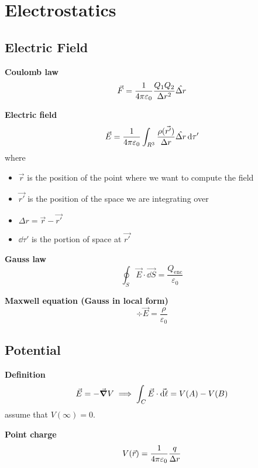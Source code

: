 \documentclass[10pt]{extarticle}
\numberwithin{equation}{section}
\begin{document}
\section{Electrostatics}
\begin{multicols}{2}
	\subsection{Electric Field}

	\textbf{Coulomb law}
	\begin{equation}
		\vec F = \frac{1}{4\pi \varepsilon_0} \frac{Q_1 Q_2}{\Delta r^2} \hat{\Delta r}
	\end{equation}

	\textbf{Electric field}
	\begin{equation}
		\vec E =
		\frac{1}{4 \pi \varepsilon_0}
		\int_{R^3} \frac{\rho (\vec{r'})}{\Delta r} \hat{\Delta r} \dd{\tau'}
	\end{equation}
	where
	\begin{itemize}
		\item $\vec r$ is the position of the point where we want to compute the field
		\item $\vec{r'}$ is the position of the space we are integrating over
		\item $\Delta r = \vec r - \vec{r'}$
		\item $\dd \tau'$ is the portion of space at $\vec{r'}$
	\end{itemize}

	\textbf{Gauss law}
	\begin{equation}
		\oint_S \vec E \cdot \vec{\dd S} = \frac{Q_\text{enc}}{\varepsilon_0}
	\end{equation}

	\textbf{Maxwell equation (Gauss in local form)}
	\begin{equation}
		\div \vec E = \frac{\rho}{\varepsilon_0}
	\end{equation}

	\subsection{Potential}

	\textbf{Definition}
	\begin{equation}
		\vec E = - \grad V \implies \int_C \vec E \cdot \vec{\dd \ell} = V(A) - V(B)
	\end{equation}
	assume that $V(\infty) = 0$.

	\textbf{Point charge}
	\begin{equation}
		V(\vec r) = \frac{1}{4 \pi \varepsilon_0} \frac{q}{\Delta r}
	\end{equation}


\end{multicols}
\end{document}
